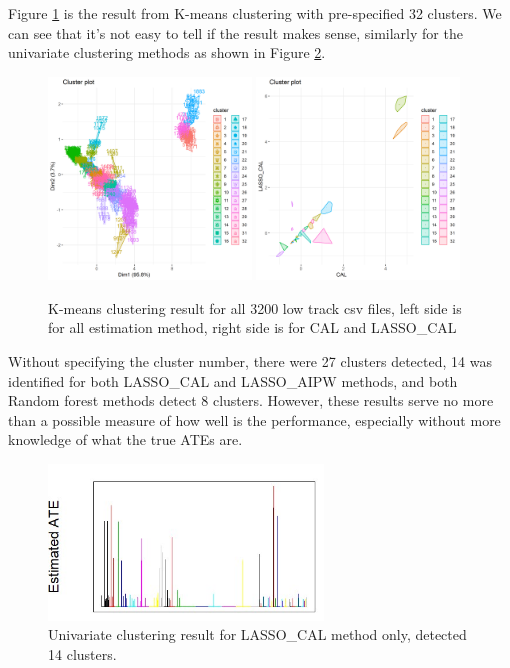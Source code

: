 \documentclass[11pt, oneside]{article}
\begin{document}
Figure \ref{fig:cluster1} is the result from K-means clustering with pre-specified 32 clusters. We can see that it's not easy to tell if the result makes sense, similarly for the univariate clustering methods as shown in Figure \ref{fig:cluster2}.
\begin{figure}[H]
\centering
\includegraphics[width=0.48\textwidth]{../plot/cluster_full.png}
\includegraphics[width=0.48\textwidth]{../plot/cluster_CAL.png}
    \caption{K-means clustering result for all 3200 low track csv files, left side is for all estimation method, right side is for CAL and LASSO\_CAL}
    \label{fig:cluster1}
\end{figure}
Without specifying the cluster number, there were 27 clusters detected, 14 was identified for both LASSO\_CAL and LASSO\_AIPW methods, and both Random forest methods detect 8 clusters. However, these results serve no more than a possible measure of how well is the performance, especially without more knowledge of what the true ATEs are. 
\begin{figure}[h]
\centering
\includegraphics[width=0.65\textwidth]{../plot/cluster_uni.jpg}
    \caption{Univariate clustering result for LASSO\_CAL method only, detected 14 clusters.}
    \label{fig:cluster2}
\end{figure}
\end{document}
